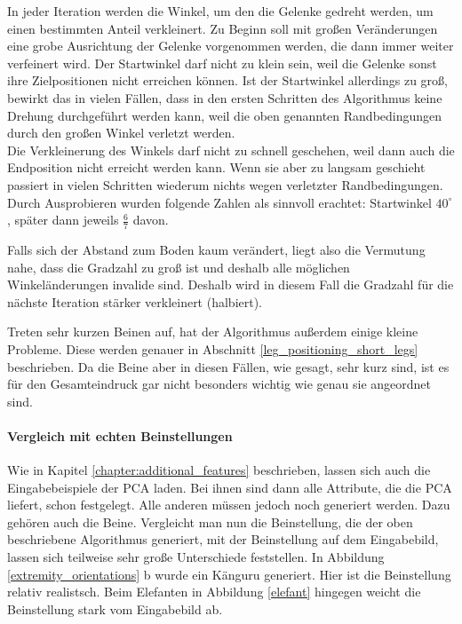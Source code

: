 In jeder Iteration werden die Winkel, um den die Gelenke gedreht werden, um einen bestimmten Anteil verkleinert. Zu Beginn soll mit großen Veränderungen eine grobe Ausrichtung der Gelenke vorgenommen werden, die dann immer weiter verfeinert wird.
Der Startwinkel darf nicht zu klein sein, weil die Gelenke sonst ihre Zielpositionen nicht erreichen können. Ist der Startwinkel allerdings zu groß, bewirkt das in vielen Fällen, dass in den ersten Schritten des Algorithmus keine Drehung durchgeführt werden kann, weil die oben genannten Randbedingungen durch den großen Winkel verletzt werden.\\
Die Verkleinerung des Winkels darf nicht zu schnell geschehen, weil dann auch die Endposition nicht erreicht werden kann. Wenn sie aber zu langsam geschieht passiert in vielen Schritten wiederum nichts wegen verletzter Randbedingungen.\\
Durch Ausprobieren wurden folgende Zahlen als sinnvoll erachtet: Startwinkel $40^{\circ}$, später dann jeweils $\frac{6}{7}$ davon.

Falls sich der Abstand zum Boden kaum verändert, liegt also die Vermutung nahe, dass die Gradzahl zu groß ist und deshalb alle möglichen Winkeländerungen invalide sind. Deshalb wird in diesem Fall die Gradzahl für die nächste Iteration stärker verkleinert (halbiert).

Treten sehr kurzen Beinen auf, hat der Algorithmus außerdem einige kleine Probleme. Diese werden genauer in Abschnitt \ref{leg_positioning_short_legs} beschrieben. Da die Beine aber in diesen Fällen, wie gesagt, sehr kurz sind, ist es für den Gesamteindruck gar nicht besonders wichtig wie genau sie angeordnet sind.

\paragraph{Vergleich mit echten Beinstellungen}
Wie in Kapitel \ref{chapter:additional_features} beschrieben, lassen sich auch die Eingabebeispiele der PCA laden. Bei ihnen sind dann alle Attribute, die die PCA liefert, schon festgelegt. Alle anderen müssen jedoch noch generiert werden.
Dazu gehören auch die Beine.
Vergleicht man nun die Beinstellung, die der oben beschriebene Algorithmus generiert, mit der Beinstellung auf dem Eingabebild, lassen sich teilweise sehr große Unterschiede feststellen. In Abbildung \ref{extremity_orientations} b wurde ein Känguru generiert. Hier ist die Beinstellung relativ realistsch. Beim Elefanten in Abbildung \ref{elefant} hingegen weicht die Beinstellung stark vom Eingabebild ab.

